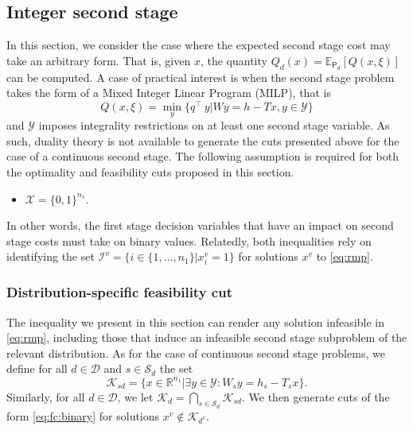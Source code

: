 \documentclass[12pt]{article}
\theoremstyle{thmstylethree}%
\newcommand{\mtc}[1] {\mathcal{#1}}
\newcommand{\pr}[1]{\ensuremath{\mathsf{#1}}}
\def\R{\ensuremath{\mathbb{R}}}
\def\Ex{\ensuremath{\mathbb{E}}}
\begin{document}
\subsection{Integer second stage}\label{sec:benders:int}
In this section, we consider the case where the expected second stage cost may take an arbitrary form.
That is, given $x$, the quantity $Q_d(x)=\Ex_{\pr{P}_d}[Q(x,\xi)]$ can be computed.
A case of practical interest is when the second stage problem takes the form of a Mixed Integer Linear Program (MILP), that is %
\begin{equation}\label{eq:sp2s:integer}
Q(x,\xi)=\min_{y}\{q^\top~ y|Wy=h-Tx, y\in\mtc{Y}\}
\end{equation}
and $\mtc{Y}$ imposes integrality restrictions on at least one second stage variable. As such, duality theory is not available to generate the cuts presented above for the case of a continuous second stage. 
The following assumption is required for both the optimality and feasibility cuts proposed in this section. 
\begin{itemize}
    \item[\textbf{A4}] $\mtc{X}=\{0,1\}^{n_1}$.
\end{itemize}
In other words, the first stage decision variables that have an impact on second stage costs must take on binary values. Relatedly, both inequalities rely on identifying the set $\mtc{I}^v=\{i\in\{1,\ldots,n_1\}|x^v_i=1\}$ for solutions $x^v$ to \eqref{eq:rmp}.


\subsubsection{Distribution-specific feasibility cut}
\label{subsubsec:mip_sp:feas_cut}

The inequality we present in this section can render any solution infeasible in \eqref{eq:rmp}, including those that induce an infeasible second stage subproblem of the relevant distribution. 
As for the case of continuous second stage problems, we define for all $d\in\mtc{D}$ and $s\in\mtc{S}_d$ the set 
$$\mtc{K}_{sd}=\big\{x\in\R^{n_1}|\exists y\in\mtc{Y}: W_sy=h_s-T_sx \big\}.$$
Similarly, for all $d\in\mtc{D}$, we let $\mtc{K}_{d}=\bigcap_{s\in\mtc{S}_d}\mtc{K}_{sd}$. We then generate cuts of the form \eqref{eq:fc:binary} for solutions $x^v\notin \mtc{K}_{d^v}$.
\end{document}
